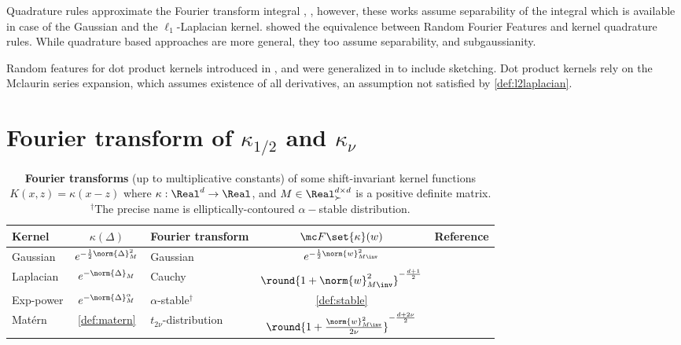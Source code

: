 \documentclass{article}
\def\matern{Mat\'ern\,}
\def\cite{\citep}
\theoremstyle{plain}
\begin{document}
Quadrature rules approximate the Fourier transform integral \cite{Gauss_quad}, \cite{Quad_based_feats}, however, these works assume separability of the integral which is available in case of the Gaussian and the $\ell_1$-Laplacian kernel. \cite{Bach_equivalence} showed the equivalence between Random Fourier Features and kernel quadrature rules. While quadrature based approaches are more general, they too assume separability, and subgaussianity. 

Random features for dot product kernels introduced 
in \cite{pmlr-v22-kar12}, and were generalized in \cite{wacker2024improved} to include sketching. Dot product kernels rely on the Mclaurin series expansion, which assumes existence of all derivatives, an assumption not satisfied by \eqref{def:l2laplacian}.

\section{Fourier transform of \texorpdfstring{$\kappa_{1/2}$ and $\kappa_{\nu}$}{kappa}}

\begin{table*}
\centering
    \begin{tabular}{lclcl}
    \toprule
    Kernel & $\kappa(\Delta) $ & 
    {Fourier transform} &
    $\mc F\set{\kappa}(w)$
    &
    Reference \\
    \midrule
    Gaussian 
    & $e^{-\frac{1}{2}\norm{\Delta}_M^2}$
    & Gaussian
    & $e^{-\frac1{2}\norm{w}_{M\inv}^2}$
    \\
    Laplacian 
    & $e^{-\norm{\Delta}_M}$
    & Cauchy
    & $\round{1+\norm{w}_{M\inv}^2}^{-\frac{d+1}{2}}$
    & \cite[Theorem 1.14]{Stein1971}
    \\
    Exp-power 
    & $e^{-\norm{\Delta}_M^\alpha}$
    & $\alpha$-stable$^\dagger$
    & \cref{def:stable}
    & \cite[Proposition 2.5.8]{samoradnitsky2017stable}
    \\
    \matern &
    \cref{def:matern}
    & $t_{2\nu}$-distribution
    & $\round{1+\frac{\norm{w}_{M\inv}^2}{2\nu}}^{-\frac{d+2\nu}{2}}$ 
    & \cite[Theorem 3.1]{joarder1996characteristic}\\
    \bottomrule
    \end{tabular}    \caption{\normalsize\label{tab:fourier}\textbf{Fourier transforms} (up to multiplicative constants) of some shift-invariant kernel functions $K(x,z)=\kappa(x-z)$ where $\kappa:\Real^d\to\Real$, and $M\in\Real^{d\times d}_{\succ}$ is a positive definite matrix.\\
    $^\dagger$The precise name is elliptically-contoured $\alpha-$stable distribution.}

\end{table*}
\end{document}
